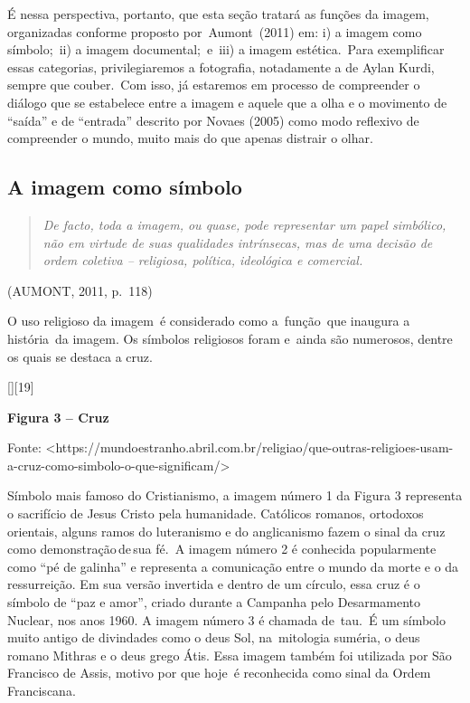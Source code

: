 \documentclass[
  letterpaper,
]{scrbook}
\begin{document}
É nessa perspectiva, portanto, que esta seção tratará as funções da
imagem, organizadas conforme proposto por~Aumont~(2011) em: i) a imagem
como símbolo;~ii) a imagem documental;~e~iii) a imagem estética.~Para
exemplificar essas categorias, privilegiaremos a fotografia, notadamente
a de Aylan Kurdi, sempre que couber.~Com isso, já estaremos em processo
de compreender o diálogo que se estabelece entre a imagem e aquele que a
olha e o movimento de ``saída'' e de ``entrada'' descrito por Novaes
(2005) como modo reflexivo de compreender o mundo, muito mais do que
apenas distrair o olhar.

\hypertarget{a-imagem-como-suxedmbolo}{%
\subsection{A imagem como símbolo~}\label{a-imagem-como-suxedmbolo}}

\begin{quote}
\emph{De facto, toda a imagem, ou quase, pode representar um papel
simbólico, não em virtude de suas qualidades intrínsecas, mas de uma
decisão de ordem coletiva -- religiosa, política, ideológica e
comercial.}~
\end{quote}

(AUMONT, 2011, p.~118)~

O uso religioso da imagem~é considerado como a~função~que inaugura a
história~da imagem. Os símbolos religiosos foram e~ainda são numerosos,
dentre os quais se destaca a cruz.~

{[}{]}{[}19{]} ~

\protect\hypertarget{_Ref503516204}{}{}\textbf{Figura 3 -- Cruz}

Fonte:
\textless https://mundoestranho.abril.com.br/religiao/que-outras-religioes-usam-a-cruz-como-simbolo-o-que-significam/\textgreater~
~

Símbolo mais famoso do Cristianismo, a imagem número 1 da Figura 3
representa o sacrifício de Jesus Cristo pela humanidade. Católicos
romanos, ortodoxos orientais, alguns ramos do luteranismo e do
anglicanismo fazem o sinal da cruz como demonstração\,de\,sua fé.~A
imagem número 2 é conhecida popularmente como ``pé de galinha'' e
representa a comunicação entre o mundo da morte e o da ressurreição. Em
sua versão invertida e dentro de um círculo, essa cruz é o símbolo de
``paz e amor'', criado durante a Campanha pelo Desarmamento Nuclear, nos
anos 1960. A imagem número 3 é chamada de~tau.~É um símbolo muito antigo
de divindades como o deus Sol, na~mitologia suméria, o deus romano
Mithras e o deus grego Átis. Essa imagem também foi utilizada por São
Francisco de Assis, motivo por que hoje~é reconhecida como sinal da
Ordem Franciscana.~
\end{document}
